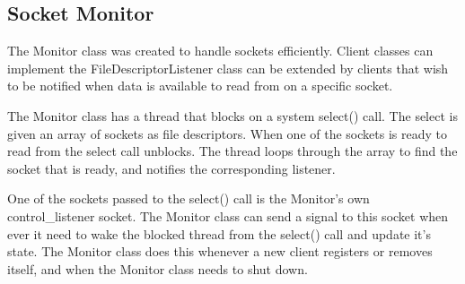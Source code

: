 \subsection{Socket Monitor}

The Monitor class was created to handle sockets efficiently. Client classes can implement the FileDescriptorListener class can be extended by clients that wish to be notified when data is available to read from on a specific socket.

The Monitor class has a thread that blocks on a system select() call. The select is given an array of sockets as file descriptors. When one of the sockets is ready to read from the select call unblocks. The thread loops through the array to find the socket that is ready, and notifies the corresponding listener.

One of the sockets passed to the select() call is the Monitor's own control\_listener socket. The Monitor class can send a signal to this socket when ever it need to wake the blocked thread from the select() call and update it's state. The Monitor class does this whenever a new client registers or removes itself, and when the Monitor class needs to shut down.